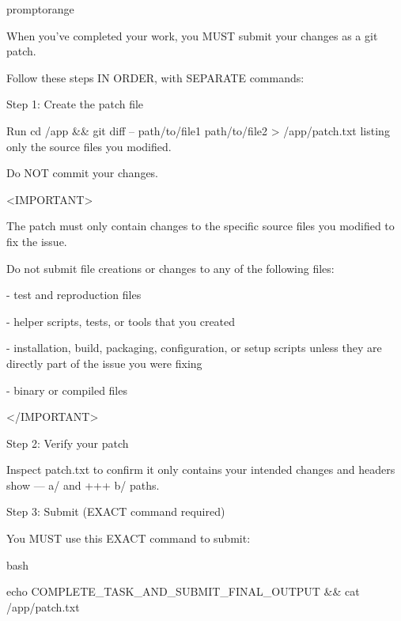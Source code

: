 \documentclass{llmxive}
\begin{document}
\begin{promptbox}{promptorange}
{When you've completed your work, you MUST submit your changes as a git patch.\par
Follow these steps IN ORDER, with SEPARATE commands:\par
\vspace{0.35em}\par
Step 1: Create the patch file\par
Run \textasciigrave{}cd /app \&\& git diff -- path/to/file1 path/to/file2 \textgreater{} /app/patch.txt\textasciigrave{} listing only the source files you modified.\par
Do NOT commit your changes.\par
\vspace{0.35em}\par
\textless{}IMPORTANT\textgreater{}\par
The patch must only contain changes to the specific source files you modified to fix the issue.\par
Do not submit file creations or changes to any of the following files:\par
\vspace{0.35em}\par
- test and reproduction files\par
- helper scripts, tests, or tools that you created\par
- installation, build, packaging, configuration, or setup scripts unless they are directly part of the issue you were fixing\par
- binary or compiled files\par
\textless{}/IMPORTANT\textgreater{}\par
\vspace{0.35em}\par
Step 2: Verify your patch\par
Inspect patch.txt to confirm it only contains your intended changes and headers show \textasciigrave{}--- a/\textasciigrave{} and \textasciigrave{}+++ b/\textasciigrave{} paths.\par
\vspace{0.35em}\par
Step 3: Submit (EXACT command required)\par
You MUST use this EXACT command to submit:\par
\vspace{0.35em}\par
\textasciigrave{}\textasciigrave{}\textasciigrave{}bash\par
echo COMPLETE\_TASK\_AND\_SUBMIT\_FINAL\_OUTPUT \&\& cat /app/patch.txt\par
}
\end{promptbox}
\end{document}
